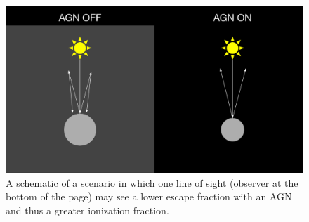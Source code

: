 \begin{figure}
    \centering
    \includegraphics[width=\textwidth]{figures/scattering_diagram.png}
    \caption{
        A schematic of a scenario in which one line of sight (observer at the bottom of the page) may see a lower escape fraction with an AGN and thus a greater ionization fraction.
    }
    \label{fig:scattering_diagram}
\end{figure}

